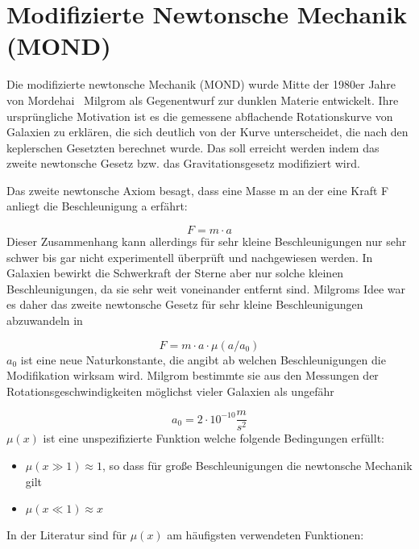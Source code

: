 \section{Modifizierte Newtonsche Mechanik (MOND)}

Die modifizierte newtonsche Mechanik (MOND) wurde Mitte der 1980er Jahre
von Mordehai \ Milgrom als Gegenentwurf zur dunklen Materie entwickelt.
Ihre ursprüngliche Motivation ist es die gemessene abflachende
Rotationskurve von Galaxien zu erklären, die sich deutlich von der
Kurve unterscheidet, die nach den keplerschen Gesetzten berechnet
wurde. Das soll erreicht werden indem das zweite newtonsche Gesetz bzw.
das Gravitationsgesetz modifiziert wird. 


\bigskip

Das zweite newtonsche Axiom besagt, dass eine Masse m an der eine Kraft
F anliegt die Beschleunigung a erfährt: 

\begin{equation*}
F=m\cdot a
\end{equation*}
Dieser Zusammenhang kann allerdings für sehr kleine Beschleunigungen nur
sehr schwer bis gar nicht experimentell überprüft und nachgewiesen
werden. In Galaxien bewirkt die Schwerkraft der Sterne aber nur solche
kleinen Beschleunigungen, da sie sehr weit voneinander entfernt sind.
Milgroms Idee \cite{Bekenstein1984} war es daher das zweite newtonsche Gesetz für sehr
kleine Beschleunigungen abzuwandeln in

\begin{equation*}
F=m\cdot a\cdot \mu (a/a_{0})
\end{equation*}
 $a_{0}$ ist eine neue Naturkonstante, die angibt ab welchen
Beschleunigungen die Modifikation wirksam wird. Milgrom bestimmte sie
aus den Messungen der Rotationsgeschwindigkeiten möglichst vieler
Galaxien als ungefähr

\begin{equation*}
a_{0}=2\cdot 10^{-10}\frac{m}{s^{2}}
\end{equation*}
 $\mu (x)$ ist eine unspezifizierte Funktion welche folgende Bedingungen
erfüllt:

\begin{itemize}
\item  $\mu (x\gg 1)\approx 1$, so dass für große Beschleunigungen die
newtonsche Mechanik gilt
\item $\mu (x\ll 1)\approx x$
\end{itemize}
In der Literatur sind für  $\mu (x)$ am häufigsten verwendeten
Funktionen:

